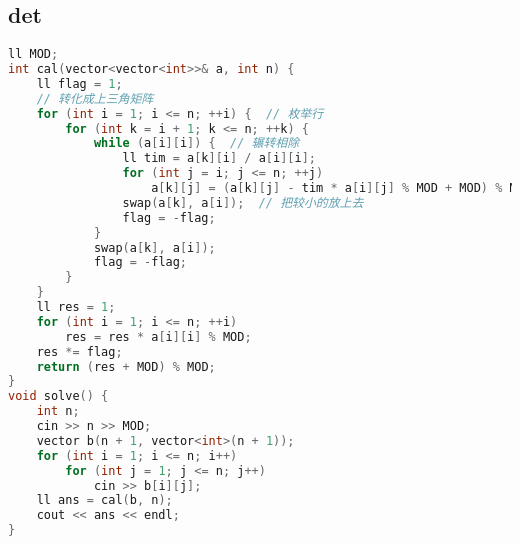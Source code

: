 \subsection{det}
\begin{lstlisting}[language=C++]
ll MOD;
int cal(vector<vector<int>>& a, int n) {
    ll flag = 1;
    // 转化成上三角矩阵
    for (int i = 1; i <= n; ++i) {  // 枚举行
        for (int k = i + 1; k <= n; ++k) {
            while (a[i][i]) {  // 辗转相除
                ll tim = a[k][i] / a[i][i];
                for (int j = i; j <= n; ++j)
                    a[k][j] = (a[k][j] - tim * a[i][j] % MOD + MOD) % MOD;
                swap(a[k], a[i]);  // 把较小的放上去
                flag = -flag;
            }
            swap(a[k], a[i]);
            flag = -flag;
        }
    }
    ll res = 1;
    for (int i = 1; i <= n; ++i)
        res = res * a[i][i] % MOD;
    res *= flag;
    return (res + MOD) % MOD;
}
void solve() {
    int n;
    cin >> n >> MOD;
    vector b(n + 1, vector<int>(n + 1));
    for (int i = 1; i <= n; i++)
        for (int j = 1; j <= n; j++)
            cin >> b[i][j];
    ll ans = cal(b, n);
    cout << ans << endl;
}

\end{lstlisting}
